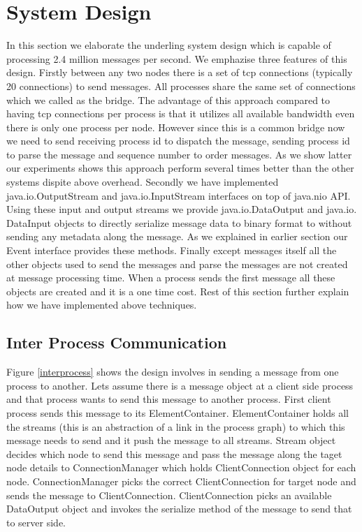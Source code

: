 \section{System Design}
In this section we elaborate the underling system design which is capable of processing 2.4 million messages per second. We emphazise three features of this design. Firstly between any two nodes there is a set of tcp connections (typically 20 connections)  to send messages. All processes share the same set of connections which we called as the bridge. The advantage of this approach compared to having tcp connections per process is that it utilizes all available bandwidth even there is only one process per node. However since this is a common bridge now we need to send receiving process id to dispatch the message, sending  process id to parse the message and sequence number to order messages. As we show latter our experiments shows this approach perform several times better than the other systems dispite above overhead. Secondly we have implemented java.io.OutputStream and java.io.InputStream interfaces on top of java.nio API. Using these input and output streams we provide java.io.DataOutput and java.io.
DataInput 
objects to directly serialize message data to binary format to without sending any metadata along the message. As we explained in earlier section our Event interface provides these methods. Finally except messages itself all the other objects used to send the messages and parse the messages are not created at message processing time. When a process sends the first message all these objects are created and it is a one time cost. Rest of this section further explain how we have implemented above techniques.
\subsection{Inter Process Communication}
Figure \ref{interprocess} shows the design involves in sending a message from one process to another. Lets assume there is a message object at a client side process and that process wants to send this message to another process. First client process sends this message to its ElementContainer. ElementContainer holds all the streams (this is an abstraction of a link in the process graph) to which this message needs to send and it push the message to all streams. Stream object decides which node to send this message and pass the message along the taget node details to ConnectionManager which holds ClientConnection object for each node. ConnectionManager picks the correct ClientConnection for target node and sends the message to ClientConnection. ClientConnection picks an available DataOutput object and invokes the serialize method of the message to send that to server side.

